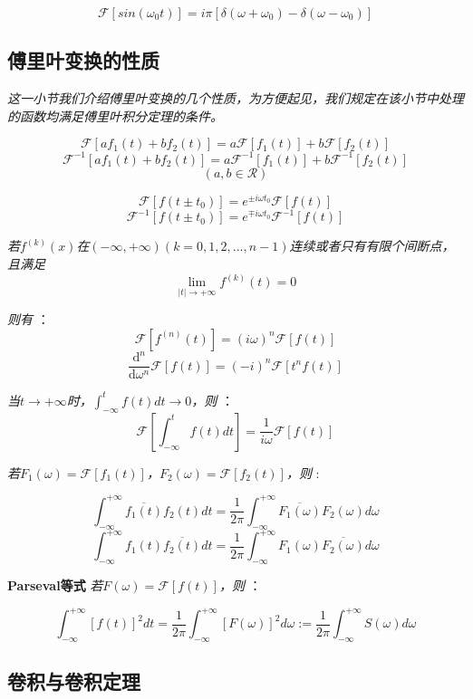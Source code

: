 \[\mathcal{F}[sin(\omega_0t)]=i\pi[\delta(\omega+\omega_0)-\delta(\omega-\omega_0)] \tag{o2}\]

\subsection{傅里叶变换的性质}

\textit{这一小节我们介绍傅里叶变换的几个性质，为方便起见，我们规定在该小节中处理的函数均满足傅里叶积分定理的条件。}


\[\mathcal{F}[af_1(t)+bf_2(t)]=a\mathcal{F}[f_1(t)]+b\mathcal{F}[f_2(t)]\]
\[\mathcal{F}^{-1}[af_1(t)+bf_2(t)]=a\mathcal{F}^{-1}[f_1(t)]+b\mathcal{F}^{-1}[f_2(t)]\]
\[(a,b \in \mathcal{R})\]

\[\mathcal{F}[f(t \pm t_0)]=e^{\pm i\omega t_0}\mathcal{F}[f(t)]\]
\[\mathcal{F}^{-1}[f(t \pm t_0)]=e^{\mp i\omega t_0}\mathcal{F}^{-1}[f(t)]\]


\textit{若$f^{(k)}(x)$在$(-\infty,+\infty)$$(k=0,1,2,...,n-1)$连续或者只有有限个间断点，且满足 }
\[\lim_{|t|\rightarrow +\infty}f^{(k)}(t)=0\]

\textit{则有 }：
\[\mathcal{F}[f^{(n)}(t)]=(i\omega)^n \mathcal{F}[f(t)]\]
\[\frac{\mathrm {d}^n}{\mathrm {d} \omega^n} \mathcal{F}[f(t)]=(-i)^n \mathcal{F}[t^nf(t)]\]


\textit{当$t \rightarrow +\infty$时，$\int_{-\infty}^{t}f(t)dt \rightarrow 0$，则 }：
\[ \mathcal{F}[\int_{-\infty}^{t}f(t)dt]=\frac{1}{i\omega}\mathcal{F}[f(t)]\]


\textit{若$F_1(\omega)=\mathcal{F}[f_1(t)]$，$F_2(\omega)=\mathcal{F}[f_2(t)]$，则 }:

\[\int_{-\infty}^{+\infty}\overline{f_1(t)}f_2(t)dt=\frac{1}{2\pi}\int_{-\infty}^{+\infty}\overline{F_1(\omega)}F_2(\omega)d\omega\]
\[\int_{-\infty}^{+\infty}f_1(t)\overline{f_2(t)}dt=\frac{1}{2\pi}\int_{-\infty}^{+\infty}F_1(\omega)\overline{F_2(\omega)}d\omega\]


\textbf{Parseval等式} \qquad \textit{若$F(\omega)=\mathcal{F}[f(t)]$，则 }：

\[\int_{-\infty}^{+\infty}[f(t)]^2dt=\frac{1}{2\pi}\int_{-\infty}^{+\infty}[F(\omega)]^2d\omega:=\frac{1}{2\pi}\int_{-\infty}^{+\infty}S(\omega)d\omega\]

\subsection{卷积与卷积定理}

